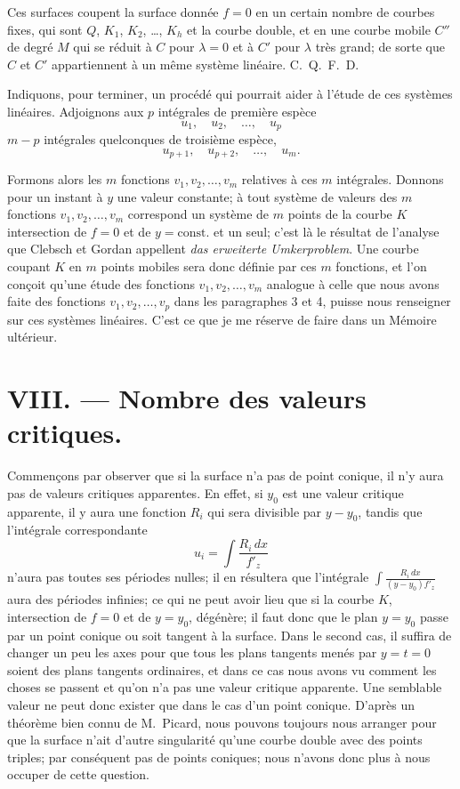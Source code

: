\documentclass{article}
\begin{document}
Ces surfaces coupent la surface donnée $f = 0$ en un certain nombre de courbes fixes, qui sont $Q$, $K_{1}$, $K_{2}$, \ldots, $K_{h}$ et la courbe double, et en une courbe mobile $C''$ de degré $M$ qui se réduit à $C$ pour $\lambda = 0$ et à $C'$ pour $\lambda$ très grand; de sorte que $C$ et $C'$ appartiennent à un même système linéaire. C.~Q.~F.~D.

Indiquons, pour terminer, un procédé qui pourrait aider à l'étude de ces systèmes linéaires. Adjoignons aux $p$ intégrales de première espèce
\[
u_{1}, \quad u_{2}, \quad \ldots, \quad u_{p}
\]
$m - p$ intégrales quelconques de troisième espèce,
\[
u_{p+1}, \quad u_{p+2}, \quad \ldots, \quad u_{m}.
\]

Formons alors les $m$ fonctions $v_{1}, v_{2}, \ldots, v_{m}$ relatives à ces $m$ intégrales. Donnons pour un instant à $y$ une valeur constante; à tout système de valeurs des $m$ fonctions $v_{1}, v_{2}, \ldots, v_{m}$ correspond un système de $m$ points de la courbe $K$ intersection de $f = 0$ et de $y = \text{const.}$ et un seul; c'est là le résultat de l'analyse que Clebsch et Gordan appellent \emph{das erweiterte Umkerproblem}. Une courbe coupant $K$ en $m$ points mobiles sera donc définie par ces $m$ fonctions, et l'on conçoit qu'une étude des fonctions $v_{1}, v_{2}, \ldots, v_{m}$ analogue à celle que nous avons faite des fonctions $v_{1}, v_{2}, \ldots, v_{p}$ dans les paragraphes 3 et 4,
puisse nous renseigner sur ces systèmes linéaires. C'est ce que je me réserve de faire dans un Mémoire ultérieur.

\section*{VIII. --- Nombre des valeurs critiques.}

Commençons par observer que si la surface n'a pas de point conique, il n'y aura pas de valeurs critiques apparentes. En effet, si $y_{0}$ est une valeur critique apparente, il y aura une fonction $R_{i}$ qui sera divisible par $y - y_{0}$, tandis que l'intégrale correspondante
\[
u_{i} = \int \frac{R_{i}\,dx}{f'_{z}}
\]
n'aura pas toutes ses périodes nulles; il en résultera que l'intégrale $\displaystyle\int \frac{R_{i}\,dx}{(y - y_{0})f'_{z}}$ aura des périodes infinies; ce qui ne peut avoir lieu que si la courbe $K$, intersection de $f = 0$ et de $y = y_{0}$, dégénère; il faut donc que le plan $y = y_{0}$ passe par un point conique ou soit tangent à la surface. Dans le second cas, il suffira de changer un peu les axes pour que tous les plans tangents menés par $y = t = 0$ soient des plans tangents ordinaires, et dans ce cas nous avons vu comment les choses se passent et qu'on n'a pas une valeur critique apparente. Une semblable valeur ne peut donc exister que dans le cas d'un point conique. D'après un théorème bien connu de M.~Picard, nous pouvons toujours nous arranger pour que la surface n'ait d'autre singularité qu'une courbe double avec des points triples; par conséquent pas de points coniques; nous n'avons donc plus à nous occuper de cette question.
\end{document}
